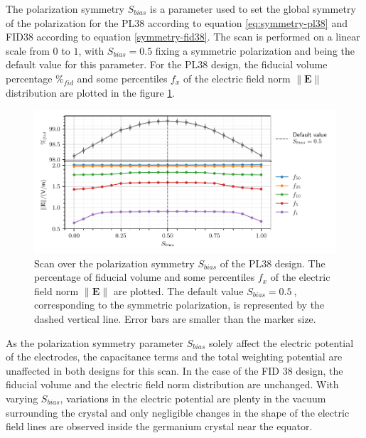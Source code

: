 The polarization symmetry $S_{bias}$ is a parameter used to set the global symmetry of the polarization for the PL38 according to equation \ref{eq:symmetry-pl38} and FID38 according to equation \ref{symmetry-fid38}. The scan is performed on a linear scale from $0$ to $1$, with $S_{bias}=0.5$ fixing a symmetric polarization and being the default value for this parameter. For the PL38 design, the fiducial volume percentage $\%_{fid}$ and some percentiles $f_x$ of the electric field norm $\| \mathbf{E} \|$ distribution are plotted in the figure \ref{fig:capacitance-fiducial-V-symmetry-pl38}.

\begin{figure}
\centering
\includegraphics[scale=1]{Figures/ElectrodesScan/capacitance_fiducial_V_symmetry_pl38.pdf}
\caption{Scan over the polarization symmetry $S_{bias}$ of the PL38 design. The percentage of fiducial volume and some percentiles $f_x$ of the electric field norm $\| \mathbf{E} \|$ are plotted. The default value $S_{bias}=\SI{0.5}{}$, corresponding to the symmetric polarization, is represented by the dashed vertical line. Error bars are smaller than the marker size.}
\label{fig:capacitance-fiducial-V-symmetry-pl38}
\end{figure}

As the polarization symmetry parameter $S_{bias}$ solely affect the electric potential of the electrodes, the capacitance terms and the total weighting potential are unaffected in both designs for this scan. 
In the case of the FID 38 design, the fiducial volume and the electric field norm distribution are unchanged. With varying $S_{bias}$, variations in the electric potential are plenty in the vacuum surrounding the crystal and only negligible changes in the shape of the electric field lines are observed inside the germanium crystal near the equator.

